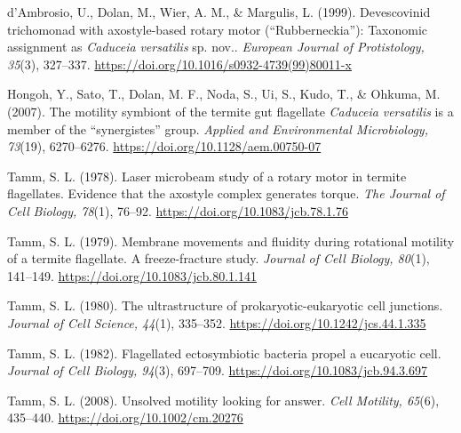 \documentclass[authordate, editorial]{jote-new-article}
\begin{document}
	



	d'Ambrosio, U., Dolan, M., Wier, A. M., \& Margulis, L. (1999). Devescovinid trichomonad with axostyle-based rotary motor (“Rubberneckia”): Taxonomic assignment as \emph{Caduceia}\emph{ }\emph{versatilis} sp. nov.. \emph{European Journal of Protistology, 35}(3), 327--337. \url{https://doi.org/10.1016/s0932-4739(99)80011-x}



	



	Hongoh, Y., Sato, T., Dolan, M. F., Noda, S., Ui, S., Kudo, T., \& Ohkuma, M. (2007). The motility symbiont of the termite gut flagellate \emph{Caduceia}\emph{ }\emph{versatilis} is a member of the “synergistes” group. \emph{Applied and Environmental Microbiology, 73}(19), 6270--6276. \url{https://doi.org/10.1128/aem.00750-07}



	



	Tamm, S. L. (1978). Laser microbeam study of a rotary motor in termite flagellates.	Evidence that the axostyle complex generates torque. \emph{The Journal of Cell}	\emph{Biology, 78}(1), 76--92. \url{https://doi.org/10.1083/jcb.78.1.76}



	



	Tamm, S. L. (1979). Membrane movements and fluidity during rotational motility of a termite flagellate. A freeze-fracture study. \emph{Journal of Cell Biology, 80}(1), 141--149. \url{https://doi.org/10.1083/jcb.80.1.141}



	



	Tamm, S. L. (1980). The ultrastructure of prokaryotic-eukaryotic cell junctions. \emph{Journal of Cell Science, 44}(1), 335--352. \url{https://doi.org/10.1242/jcs.44.1.335}


	



	Tamm, S. L. (1982). Flagellated ectosymbiotic bacteria propel a eucaryotic cell. \emph{Journal} \emph{of Cell Biology, 94}(3), 697--709. \url{https://doi.org/10.1083/jcb.94.3.697}



	



	Tamm, S. L. (2008). Unsolved motility looking for answer. \emph{Cell Motility, 65}(6), 435--440. \url{https://doi.org/10.1002/cm.20276}
\end{document}
